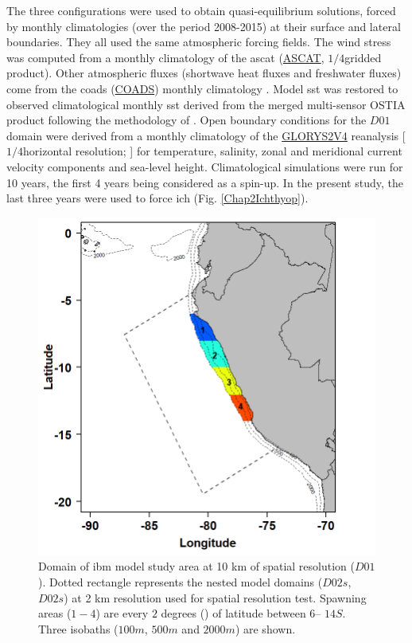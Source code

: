 The three configurations were used to obtain quasi-equilibrium solutions, forced by monthly climatologies (over the period 2008-2015) at their surface and lateral boundaries. They all used the same atmospheric forcing fields. The wind stress was computed from a monthly climatology of the \acrlong{ascat} (\href{https://www.ospo.noaa.gov/Products/atmosphere/ascat/}{ASCAT}, $1/4$\textdegree gridded product). Other atmospheric fluxes (shortwave heat fluxes and freshwater fluxes) come from the \acrlong{coads} (\href{https://repository.library.noaa.gov/view/noaa/49337}{COADS}) monthly climatology \citep{DasiYoun1994}. Model \acrfull{sst} was restored to observed climatological monthly \acrshort{sst} derived from the merged multi-sensor OSTIA product \citep{DonlMart2012} following the methodology of \citep{BarnSief1995}. Open boundary conditions for the $D01$ domain were derived from a monthly climatology of the \href{https://www.mercator-ocean.eu/en/ocean-science/glorys/}{GLORYS2V4} reanalysis [$1/4$\textdegree horizontal resolution; \citep{FerrPare2012}] for temperature, salinity, zonal and meridional current velocity components and sea-level height. Climatological simulations were run for 10 years, the first 4 years being considered as a spin-up. In the present study, the last three years were used to force \gls{ich} (Fig. \ref{Chap2Ichthyop}).\\

\begin{figure}[H]
	\includegraphics[width=1.0\textwidth]{figures/Chap2SpawningZone.png}
	\centering
	\caption{Domain of \acrshort{ibm} model study area at 10 km of spatial resolution ($D01$). Dotted rectangle represents the nested model domains ($D02s$, $D02s$) at 2 km resolution used for spatial resolution test. Spawning areas ($1 - 4$) are every $2$ degrees (\textdegree) of latitude between $6$\textdegree – $14$\textdegree $S$. Three isobaths ($100 m$, $500 m$ and $2000 m$) are shown.}
	\label{Chap2SpawningZone}
\end{figure}


